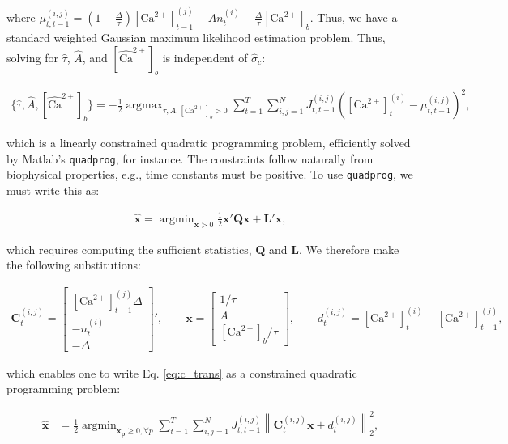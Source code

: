 \documentclass[10pt]{article}
\providecommand{\ve}[1]{\boldsymbol{#1}}
\providecommand{\norm}[1]{\left \lVert#1 \right  \rVert}
\providecommand{\ve}[1]{\boldsymbol{#1}}
\DeclareMathOperator*{\argmax}{argmax}
\DeclareMathOperator*{\argmin}{argmin}
\newcommand{\Ca}{[\text{Ca}^{2+}]}
\newcommand{\wCab}{[\widehat{\text{Ca}}^{2+}]_b}
\begin{document}
\noindent where $\mu_{t,t-1}^{(i,j)}= (1 - \frac{\Delta}{\tau}) \Ca_{t-1}^{(j)} - A n_t^{(i)} - \frac{\Delta}{\tau} \Ca_b$.  Thus, we have a standard weighted Gaussian maximum likelihood estimation problem.  Thus, solving for $\widehat{\tau}$, $\widehat{A}$, and $\wCab$ is independent of $\widehat{\sigma}_c$:

\begin{align} \label{eq:c_trans}
\{\widehat{\tau}, \widehat{A}, \wCab\} = -\frac{1}{2}  \argmax_{\tau, A, \Ca_b > 0} \sum_{t=1}^T \sum_{i,j=1}^N  J^{(i,j)}_{t,t-1} \left(\Ca_t^{(i)} - \mu_{t,t-1}^{(i,j)} \right)^2,
\end{align}

\noindent which is a linearly constrained quadratic programming problem, efficiently solved by Matlab's \texttt{quadprog}, for instance. The constraints follow naturally from biophysical properties, e.g., time constants must be positive. To use \texttt{quadprog}, we must write this as:

\begin{align} \label{eq:quadprog}
\widehat{\ve{x}} = \argmin_{\ve{x} > 0} \frac{1}{2}\ve{x}' \ve{Q} \ve{x} + \ve{L}' \ve{x},
\end{align}

\noindent which requires computing the sufficient statistics, $\ve{Q}$ and $\ve{L}$.  We therefore make the following substitutions:

\begin{align} \label{eq:param_def}
\ve{C}^{(i,j)}_t=
{\begin{bmatrix} \Ca_{t-1}^{(j)} \Delta \\ -n_t^{(i)} \\ -\Delta \end{bmatrix}}',
\qquad \ve{x}= \begin{bmatrix} 1/\tau \\ A \\ \Ca_b/\tau \end{bmatrix},
\qquad d^{(i,j)}_t= \Ca_t^{(i)} -\Ca_{t-1}^{(j)},
\end{align}

\noindent which enables one to write Eq. \ref{eq:c_trans} as a constrained quadratic programming problem:

\begin{equation}
\begin{split}
\widehat{\ve{x}} &= \frac{1}{2}  \argmin_{\ve{x_p} \geq 0, \forall p} \sum_{t=1}^T \sum_{i,j=1}^N J^{(i,j)}_{t,t-1}  \norm{\ve{C}^{(i,j)}_t \ve{x} + d^{(i,j)}_t}_2^2,
\end{split}
\end{equation}
\end{document}
